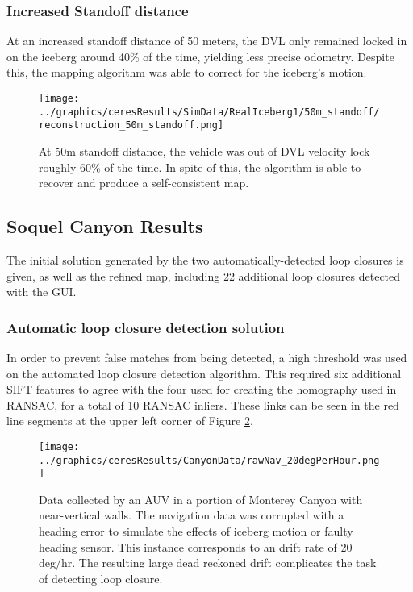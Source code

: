\subsubsection{Increased Standoff distance}

At an increased standoff distance of 50 meters, the DVL only remained locked in on the iceberg around 40\% of the time, yielding less precise odometry. Despite this, the mapping algorithm was able to correct for the iceberg's motion.

 \begin{figure}[!htb]
   \centering
   \texttt{[image: ../graphics/ceresResults/SimData/RealIceberg1/50m\_standoff/reconstruction\_50m\_standoff.png]} %
   \caption{At 50m standoff distance, the vehicle was out of DVL velocity lock roughly 60\% of the time. In spite of this, the algorithm is able to recover and produce a self-consistent map.}
   \label{fig:FullSim50m}
\end{figure}

\subsection{Soquel Canyon Results}

The initial solution generated by the two automatically-detected loop closures is given, as well as the refined map, including 22 additional loop closures detected with the GUI.

\subsubsection{Automatic loop closure detection solution}

In order to prevent false matches from being detected, a high threshold was used on the automated loop closure detection algorithm. This required six additional SIFT features to agree with the four used for creating the homography used in RANSAC, for a total of 10 RANSAC inliers. These links can be seen in the red line segments at the upper left corner of Figure \ref{fig:RealDataWithDrift}.

 \begin{figure}[!htb]
   \centering
   \texttt{[image: ../graphics/ceresResults/CanyonData/rawNav\_20degPerHour.png]} %
   \caption{Data collected by an AUV in a portion of Monterey Canyon with near-vertical walls. The navigation data was corrupted with a heading error to simulate the effects of iceberg motion or faulty heading sensor. This instance corresponds to an drift rate of 20 deg/hr. The resulting large dead reckoned drift complicates the task of detecting loop closure.}
   \label{fig:RealDataWithDrift}
\end{figure}

